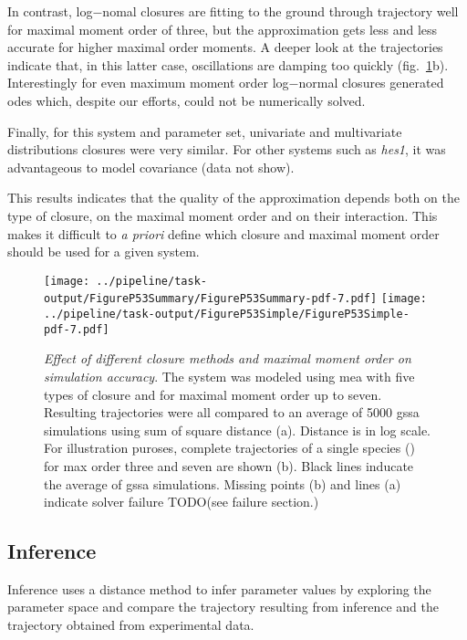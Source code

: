 In contrast, log$-$nomal closures are fitting to the ground through trajectory well for maximal moment order of three,
but the approximation gets less and less accurate for higher maximal order moments.
A deeper look at the trajectories indicate that, in this latter case,
oscillations are damping too quickly (fig.~\ref{fig:max_order_and_closure_on_distance}b).
Interestingly for even maximum moment order log$-$normal closures generated \gls{ode}s which,
despite our efforts, could not be numerically solved.

Finally, for this system and parameter set, univariate and multivariate distributions closures were very similar.
For other systems such as \emph{hes1}, it was advantageous to model covariance (data not show).

This results indicates that the quality of the approximation depends both on the type of closure, on the maximal moment order and on their interaction. This makes it difficult to \emph{a priori} define which closure and maximal moment order should be used for a given system.

\begin{figure}

\texttt{[image: ../pipeline/task-output/FigureP53Summary/FigureP53Summary-pdf-7.pdf]}
\texttt{[image: ../pipeline/task-output/FigureP53Simple/FigureP53Simple-pdf-7.pdf]}
\caption{\emph{Effect of different closure methods and maximal moment order on simulation accuracy}.
The \pft system was modeled using \gls{mea} with five types of closure and for maximal moment order up to seven.
Resulting trajectories were all compared to an average of 5000 \gls{gssa} simulations using sum of square distance (a).
Distance is in log scale.
For illustration puroses, complete trajectories of a single species (\pft) for max order three and seven are shown (b).
Black lines inducate the average of \gls{gssa} simulations. Missing points (b) and lines (a) indicate solver failure
TODO(see failure section.)}

\label{fig:max_order_and_closure_on_distance}
\end{figure}

\subsection{Inference}
Inference uses a distance method to infer parameter values by exploring the parameter space and compare the trajectory resulting from inference and the trajectory obtained from experimental data. 

